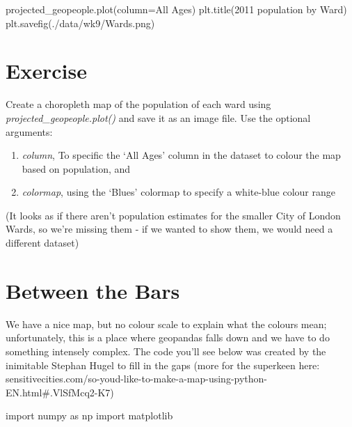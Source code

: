 \documentclass[
  letterpaper,
  DIV=11,
  numbers=noendperiod]{scrreprt}
\newenvironment{Shaded}{\begin{snugshade}}{\end{snugshade}}
\newcommand{\ImportTok}[1]{\textcolor[rgb]{0.00,0.46,0.62}{#1}}
\newcommand{\NormalTok}[1]{\textcolor[rgb]{0.00,0.23,0.31}{#1}}
\newcommand{\OperatorTok}[1]{\textcolor[rgb]{0.37,0.37,0.37}{#1}}
\newcommand{\StringTok}[1]{\textcolor[rgb]{0.13,0.47,0.30}{#1}}
\providecommand{\tightlist}{%
  \setlength{\itemsep}{0pt}\setlength{\parskip}{0pt}}\usepackage{longtable,booktabs,array}
\begin{document}
\begin{Shaded}
\begin{Highlighting}[]
\NormalTok{projected\_geopeople.plot(column}\OperatorTok{=}\StringTok{\textquotesingle{}All Ages\textquotesingle{}}\NormalTok{)}
\NormalTok{plt.title(}\StringTok{\textquotesingle{}2011 population by Ward\textquotesingle{}}\NormalTok{)}
\NormalTok{plt.savefig(}\StringTok{\textquotesingle{}./data/wk9/Wards.png\textquotesingle{}}\NormalTok{)}
\end{Highlighting}
\end{Shaded}

\hypertarget{exercise-22}{%
\section{Exercise}\label{exercise-22}}

Create a choropleth map of the population of each ward using
\emph{projected\_geopeople.plot()} and save it as an image file. Use the
optional arguments:

\begin{enumerate}
\def\labelenumi{\arabic{enumi}.}
\tightlist
\item
  \emph{column}, To specific the `All Ages' column in the dataset to
  colour the map based on population, and
\item
  \emph{colormap}, using the `Blues' colormap to specify a white-blue
  colour range
\end{enumerate}

(It looks as if there aren't population estimates for the smaller City
of London Wards, so we're missing them - if we wanted to show them, we
would need a different dataset)

\hypertarget{between-the-bars}{%
\section{Between the Bars}\label{between-the-bars}}

We have a nice map, but no colour scale to explain what the colours
mean; unfortunately, this is a place where geopandas falls down and we
have to do something intensely complex. The code you'll see below was
created by the inimitable Stephan Hugel to fill in the gaps (more for
the superkeen here:
sensitivecities.com/so-youd-like-to-make-a-map-using-python-EN.html\#.VlSfMcq2-K7)

\begin{Shaded}
\begin{Highlighting}[]
\ImportTok{import}\NormalTok{ numpy }\ImportTok{as}\NormalTok{ np}
\ImportTok{import}\NormalTok{ matplotlib}
\end{Highlighting}
\end{Shaded}
\end{document}
